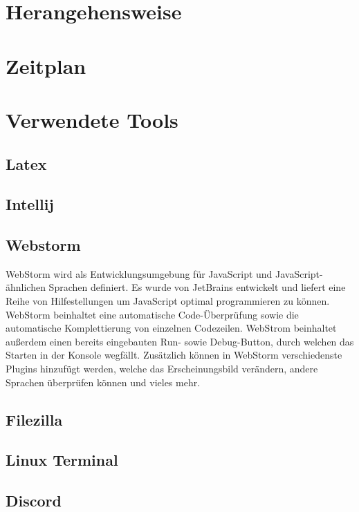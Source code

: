 \section{Herangehensweise}


\section{Zeitplan}


\section{Verwendete Tools}



\subsection{Latex}
\subsection{Intellij}

\subsection{Webstorm}
WebStorm wird als Entwicklungsumgebung für JavaScript und JavaScript-ähnlichen Sprachen definiert. Es wurde von JetBrains entwickelt und liefert eine Reihe von Hilfestellungen um JavaScript optimal programmieren zu können. WebStorm beinhaltet eine automatische Code-Überprüfung sowie die automatische Komplettierung von einzelnen Codezeilen. WebStrom beinhaltet außerdem einen bereits eingebauten Run- sowie Debug-Button, durch welchen das Starten in der Konsole wegfällt. Zusätzlich können in WebStorm verschiedenste Plugins hinzufügt werden, welche das Erscheinungsbild verändern, andere Sprachen überprüfen können und vieles mehr.     

\subsection{Filezilla}
\subsection{Linux Terminal}
\subsection{Discord}
